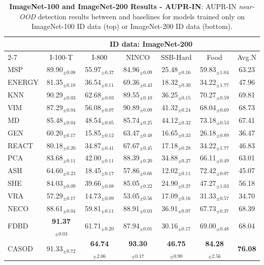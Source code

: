 \begin{table}[t!]
{\begin{tabular}{|l|ccccc|c|}
			\multirow{2}{*}{} &  \multicolumn{6}{c|}{ID data: ImageNet-200}  \\ \cline{2-7}
			& I-100-T & I-800  & NINCO & SSB-Hard & Food & Avg.N\\ \hline
            MSP    & 89.90$_{\pm 0.08}$ & 55.97$_{\pm 0.37}$ & 84.96$_{\pm 0.09}$ & 25.48$_{\pm 0.16}$ & 59.83$_{\pm 1.04}$ & 63.23  \\
ENERGY & 81.35$_{\pm 0.18}$ & 36.54$_{\pm 0.11}$ & 69.36$_{\pm 0.43}$ & 18.32$_{\pm 0.30}$ & 34.22$_{\pm 1.77}$ & 47.96  \\
KNN    & 90.29$_{\pm 0.03}$ & 62.68$_{\pm 0.03}$ & 89.55$_{\pm 0.10}$ & 36.25$_{\pm 0.15}$ & 70.27$_{\pm 0.59}$ & 69.81 \\
VIM    & 87.29$_{\pm 0.04}$ & 56.08$_{\pm 0.07}$ & 90.89$_{\pm 0.09}$ & 41.32$_{\pm 0.24}$ & 68.04$_{\pm 0.69}$ & 68.73 \\
MD     & 85.48$_{\pm 0.04}$ & 48.54$_{\pm 0.05}$ & 85.74$_{\pm 0.25}$ & 44.12$_{\pm 0.32}$ & 73.18$_{\pm 0.53}$ & 67.41  \\
GEN    & 60.20$_{\pm 0.17}$ & 15.85$_{\pm 0.12}$ & 63.47$_{\pm 0.48}$ & 16.65$_{\pm 0.33}$ & 26.18$_{\pm 0.89}$ & 36.47  \\
REACT  & 80.18$_{\pm 0.20}$ & 34.87$_{\pm 0.41}$ & 67.67$_{\pm 0.45}$ & 17.18$_{\pm 0.28}$ & 34.22$_{\pm 1.77}$ & 46.83 \\
PCA    & 83.68$_{\pm 0.11}$ & 42.00$_{\pm 0.11}$ & 88.39$_{\pm 0.20}$ & 34.88$_{\pm 0.27}$ & 66.11$_{\pm 0.49}$ & 63.01  \\
ASH    & 64.60$_{\pm 0.23}$ & 18.45$_{\pm 0.17}$ & 57.86$_{\pm 0.66}$ & 12.02$_{\pm 0.11}$ & 72.42$_{\pm 0.07}$ & 45.07 \\
SHE    & 84.03$_{\pm 0.09}$ & 39.66$_{\pm 0.08}$ & 85.05$_{\pm 0.22}$ & 24.90$_{\pm 0.27}$ & 47.27$_{\pm 1.03}$ & 56.18  \\
VRA    & 57.29$_{\pm 0.17}$ & 14.73$_{\pm 0.09}$ & 53.05$_{\pm 0.56}$ & 17.09$_{\pm 0.16}$ & 31.33$_{\pm 0.57}$ & 34.70  \\
NECO   & 88.61$_{\pm 0.04}$ & 59.81$_{\pm 0.11}$ & 88.91$_{\pm 0.03}$ & 36.91$_{\pm 0.07}$ & 67.73$_{\pm 0.37}$ & 68.39 \\
FDBD   & \textbf{91.37}$_{\pm 0.03}$ & 61.71$_{\pm 0.20}$ & 87.94$_{\pm 0.01}$ & 30.16$_{\pm 0.17}$ & 69.00$_{\pm 0.48}$ & 68.04 \\ \hline
CASOD  & 91.33$_{\pm 0.72}$ & \textbf{64.74}$_{\pm 2.06}$ & \textbf{93.30}$_{\pm 0.17}$ & \textbf{46.75}$_{\pm 0.90}$ & \textbf{84.28}$_{\pm 2.56}$ & \textbf{76.08} \\ \hline
		\end{tabular}
	}
	\caption{\textbf{ImageNet-100 and ImageNet-200 Results - AUPR-IN}: AUPR-IN \textit{near-OOD} detection results between \sys and baselines for models trained only on ImageNet-100 ID data (top) or ImageNet-200 ID data (bottom).
	}
	\label{tab:table_ood_auprin}
\end{table}

